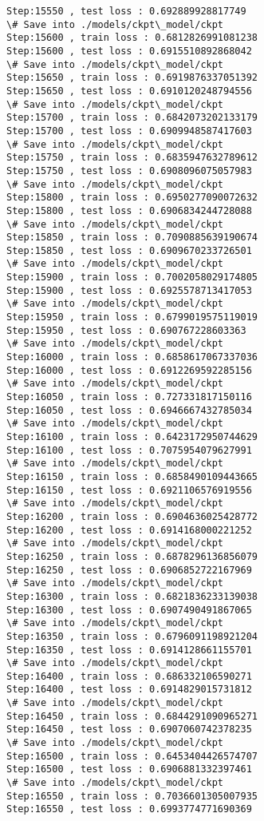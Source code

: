 \documentclass[11pt]{article}
\begin{document}
\begin{Verbatim}[commandchars=\\\{\}]
Step:15550 , test loss : 0.692889928817749
\# Save into ./models/ckpt\_model/ckpt
Step:15600 , train loss : 0.6812826991081238
Step:15600 , test loss : 0.6915510892868042
\# Save into ./models/ckpt\_model/ckpt
Step:15650 , train loss : 0.6919876337051392
Step:15650 , test loss : 0.6910120248794556
\# Save into ./models/ckpt\_model/ckpt
Step:15700 , train loss : 0.6842073202133179
Step:15700 , test loss : 0.6909948587417603
\# Save into ./models/ckpt\_model/ckpt
Step:15750 , train loss : 0.6835947632789612
Step:15750 , test loss : 0.6908096075057983
\# Save into ./models/ckpt\_model/ckpt
Step:15800 , train loss : 0.6950277090072632
Step:15800 , test loss : 0.6906834244728088
\# Save into ./models/ckpt\_model/ckpt
Step:15850 , train loss : 0.7090885639190674
Step:15850 , test loss : 0.6909670233726501
\# Save into ./models/ckpt\_model/ckpt
Step:15900 , train loss : 0.7002058029174805
Step:15900 , test loss : 0.6925578713417053
\# Save into ./models/ckpt\_model/ckpt
Step:15950 , train loss : 0.6799019575119019
Step:15950 , test loss : 0.690767228603363
\# Save into ./models/ckpt\_model/ckpt
Step:16000 , train loss : 0.6858617067337036
Step:16000 , test loss : 0.6912269592285156
\# Save into ./models/ckpt\_model/ckpt
Step:16050 , train loss : 0.727331817150116
Step:16050 , test loss : 0.6946667432785034
\# Save into ./models/ckpt\_model/ckpt
Step:16100 , train loss : 0.6423172950744629
Step:16100 , test loss : 0.7075954079627991
\# Save into ./models/ckpt\_model/ckpt
Step:16150 , train loss : 0.6858490109443665
Step:16150 , test loss : 0.6921106576919556
\# Save into ./models/ckpt\_model/ckpt
Step:16200 , train loss : 0.6904636025428772
Step:16200 , test loss : 0.6914168000221252
\# Save into ./models/ckpt\_model/ckpt
Step:16250 , train loss : 0.6878296136856079
Step:16250 , test loss : 0.6906852722167969
\# Save into ./models/ckpt\_model/ckpt
Step:16300 , train loss : 0.6821836233139038
Step:16300 , test loss : 0.6907490491867065
\# Save into ./models/ckpt\_model/ckpt
Step:16350 , train loss : 0.6796091198921204
Step:16350 , test loss : 0.6914128661155701
\# Save into ./models/ckpt\_model/ckpt
Step:16400 , train loss : 0.686332106590271
Step:16400 , test loss : 0.6914829015731812
\# Save into ./models/ckpt\_model/ckpt
Step:16450 , train loss : 0.6844291090965271
Step:16450 , test loss : 0.6907060742378235
\# Save into ./models/ckpt\_model/ckpt
Step:16500 , train loss : 0.6453404426574707
Step:16500 , test loss : 0.6906881332397461
\# Save into ./models/ckpt\_model/ckpt
Step:16550 , train loss : 0.7036601305007935
Step:16550 , test loss : 0.6993774771690369

\end{Verbatim}
\end{document}
